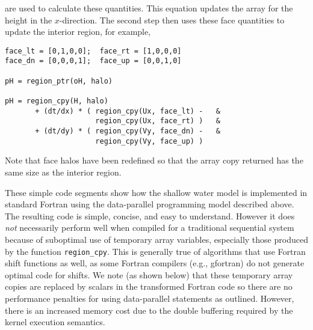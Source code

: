 \noindent
are used to calculate these quantities.  This equation updates the array for the
height in the $x$-direction.  The second step then uses these face quantities to
update the interior region, for example,

{\small
\begin{verbatim}
face_lt = [0,1,0,0];  face_rt = [1,0,0,0]
face_dn = [0,0,0,1];  face_up = [0,0,1,0]

pH = region_ptr(oH, halo)

pH = region_cpy(H, halo)
       + (dt/dx) * ( region_cpy(Ux, face_lt) -   &
                     region_cpy(Ux, face_rt) )   &
       + (dt/dy) * ( region_cpy(Vy, face_dn) -   &
                     region_cpy(Vy, face_up) )
\end{verbatim}
}

\noindent
Note that face halos have been redefined so that the array copy
returned has the same size as the interior region.

These simple code segments show how the shallow water model is implemented in
standard Fortran using the data-parallel programming model described above.  The
resulting code is simple, concise, and easy to understand.  However it does
\emph{not} necessarily perform well when compiled for a traditional sequential
system because of suboptimal use of temporary array variables,
especially those produced by the function {\tt region\_cpy}.  This is generally true
of algorithms that use Fortran shift functions as well, as some Fortran
compilers (e.g., gfortran) do not generate optimal code for shifts.  We note (as
shown below) that these temporary array copies are replaced by scalars in the
transformed Fortran code so there are no performance penalties for using
data-parallel statements as outlined.  However, there is an increased memory
cost due to the double buffering required by the kernel execution semantics.
